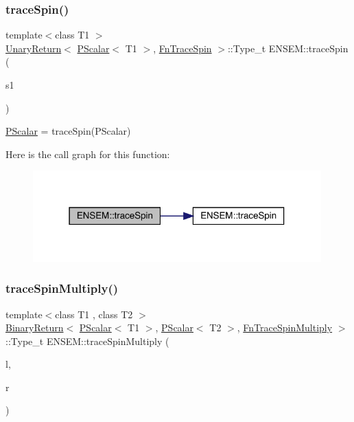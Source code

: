 \subsubsection{\texorpdfstring{traceSpin()}{traceSpin()}}
{\footnotesize\ttfamily template$<$class T1 $>$ \\
\mbox{\hyperlink{structENSEM_1_1UnaryReturn}{Unary\+Return}}$<$ \mbox{\hyperlink{classENSEM_1_1PScalar}{P\+Scalar}}$<$ T1 $>$, \mbox{\hyperlink{structENSEM_1_1FnTraceSpin}{Fn\+Trace\+Spin}} $>$\+::Type\+\_\+t E\+N\+S\+E\+M\+::trace\+Spin (\begin{DoxyParamCaption}\item[{const \mbox{\hyperlink{classENSEM_1_1PScalar}{P\+Scalar}}$<$ T1 $>$ \&}]{s1 }\end{DoxyParamCaption})\hspace{0.3cm}{\ttfamily [inline]}}



\mbox{\hyperlink{classENSEM_1_1PScalar}{P\+Scalar}} = trace\+Spin(\+P\+Scalar) 

Here is the call graph for this function\+:\nopagebreak
\begin{figure}[H]
\begin{center}
\leavevmode
\includegraphics[width=315pt]{db/dcc/group__primscalar_gacb9de2d99f632eb0d424014a2afbdef7_cgraph}
\end{center}
\end{figure}
\mbox{\label{group__primscalar_gadf055daaaacb2711107a9c9dbba9a129}} 
\subsubsection{\texorpdfstring{traceSpinMultiply()}{traceSpinMultiply()}}
{\footnotesize\ttfamily template$<$class T1 , class T2 $>$ \\
\mbox{\hyperlink{structENSEM_1_1BinaryReturn}{Binary\+Return}}$<$ \mbox{\hyperlink{classENSEM_1_1PScalar}{P\+Scalar}}$<$ T1 $>$, \mbox{\hyperlink{classENSEM_1_1PScalar}{P\+Scalar}}$<$ T2 $>$, \mbox{\hyperlink{structENSEM_1_1FnTraceSpinMultiply}{Fn\+Trace\+Spin\+Multiply}} $>$\+::Type\+\_\+t E\+N\+S\+E\+M\+::trace\+Spin\+Multiply (\begin{DoxyParamCaption}\item[{const \mbox{\hyperlink{classENSEM_1_1PScalar}{P\+Scalar}}$<$ T1 $>$ \&}]{l,  }\item[{const \mbox{\hyperlink{classENSEM_1_1PScalar}{P\+Scalar}}$<$ T2 $>$ \&}]{r }\end{DoxyParamCaption})\hspace{0.3cm}{\ttfamily [inline]}}



